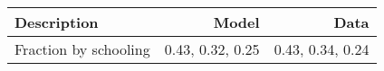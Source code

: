\begin{tabular}{lrr}
\hline
Description & Model  & Data  \\
\hline
Fraction by schooling & 0.43, 0.32, 0.25  & 0.43, 0.34, 0.24  \\
\hline
\end{tabular}%
